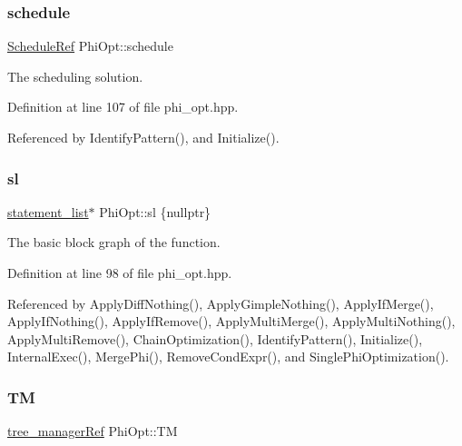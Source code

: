 \subsubsection{\texorpdfstring{schedule}{schedule}}
{\footnotesize\ttfamily \hyperlink{schedule_8hpp_af67f402958b3b52a1ec5cc4ce08ae3b9}{Schedule\+Ref} Phi\+Opt\+::schedule\hspace{0.3cm}{\ttfamily [private]}}



The scheduling solution. 



Definition at line 107 of file phi\+\_\+opt.\+hpp.



Referenced by Identify\+Pattern(), and Initialize().

\mbox{\label{classPhiOpt_a6a4406457378eb931a2760352c11c014}} 
\subsubsection{\texorpdfstring{sl}{sl}}
{\footnotesize\ttfamily \hyperlink{structstatement__list}{statement\+\_\+list}$\ast$ Phi\+Opt\+::sl \{nullptr\}\hspace{0.3cm}{\ttfamily [private]}}



The basic block graph of the function. 



Definition at line 98 of file phi\+\_\+opt.\+hpp.



Referenced by Apply\+Diff\+Nothing(), Apply\+Gimple\+Nothing(), Apply\+If\+Merge(), Apply\+If\+Nothing(), Apply\+If\+Remove(), Apply\+Multi\+Merge(), Apply\+Multi\+Nothing(), Apply\+Multi\+Remove(), Chain\+Optimization(), Identify\+Pattern(), Initialize(), Internal\+Exec(), Merge\+Phi(), Remove\+Cond\+Expr(), and Single\+Phi\+Optimization().

\mbox{\label{classPhiOpt_ac2182460316bcd03e5e773a93cb187e5}} 
\subsubsection{\texorpdfstring{TM}{TM}}
{\footnotesize\ttfamily \hyperlink{tree__manager_8hpp_a96ff150c071ce11a9a7a1e40590f205e}{tree\+\_\+manager\+Ref} Phi\+Opt\+::\+TM\hspace{0.3cm}{\ttfamily [private]}}



